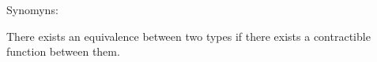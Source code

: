 \begin{code}%
\>[0]\<%
\\
\>[0][@{}l@{\AgdaIndent{0}}]%
\>[2]\AgdaSymbol{:}\AgdaSpace{}%
\AgdaSymbol{\{}\AgdaSpace{}%
\AgdaSymbol{:}\AgdaSpace{}%
\AgdaSpace{}%
\AgdaSymbol{\}}\AgdaSpace{}%
\AgdaSymbol{\{}\AgdaSpace{}%
\AgdaSymbol{:}\AgdaSpace{}%
\AgdaSpace{}%
\AgdaSymbol{\}}\<%
\\
%
\>[2]\AgdaSpace{}%
\AgdaSymbol{(}\AgdaSpace{}%
\AgdaSymbol{:}\AgdaSpace{}%
\AgdaSpace{}%
\AgdaSpace{}%
\AgdaSymbol{)}\<%
\\
%
\>[2]\AgdaSpace{}%
\AgdaSpace{}%
\AgdaSymbol{(}\AgdaSpace{}%
\AgdaSpace{}%
\AgdaSymbol{)}\<%
\\
%
\\[\AgdaEmptyExtraSkip]%
\>[0]\AgdaSpace{}%
\AgdaSymbol{\{}\AgdaSpace{}%
\AgdaSymbol{=}\AgdaSpace{}%
\AgdaSymbol{\}}\AgdaSpace{}%
\AgdaSpace{}%
\AgdaSymbol{=}\AgdaSpace{}%
\AgdaSymbol{(}\AgdaSpace{}%
\AgdaSymbol{:}\AgdaSpace{}%
\AgdaSymbol{)}\AgdaSpace{}%
\AgdaSpace{}%
\AgdaSpace{}%
\AgdaSymbol{(}\AgdaSpace{}%
\AgdaSpace{}%
\AgdaSymbol{)}\<%
\end{code}

Synomyns:
\begin{code}%
\>[0]\AgdaSpace{}%
\AgdaSymbol{=}\AgdaSpace{}%
\<%
\end{code}

There exists an equivalence between two types if there exists a
contractible function between them.


\begin{code}%
\>[0]\<%
\\
\>[0][@{}l@{\AgdaIndent{0}}]%
\>[2]\AgdaSymbol{:}\AgdaSpace{}%
\AgdaSymbol{\{}\AgdaSpace{}%
\AgdaSymbol{:}\AgdaSpace{}%
\AgdaSpace{}%
\AgdaSymbol{\}}\AgdaSpace{}%
\AgdaSymbol{\{}\AgdaSpace{}%
\AgdaSymbol{:}\AgdaSpace{}%
\AgdaSpace{}%
\AgdaSymbol{\}}\<%
\\
%
\>[2]%
\>[5]\AgdaSymbol{(}\AgdaSpace{}%
\AgdaSymbol{:}\AgdaSpace{}%
\AgdaSpace{}%
\AgdaSpace{}%
\AgdaSymbol{)}\<%
\\
%
\>[2]\AgdaSpace{}%
\AgdaSpace{}%
\AgdaSymbol{(}\AgdaSpace{}%
\AgdaSpace{}%
\AgdaSymbol{)}\<%
\\
%
\\[\AgdaEmptyExtraSkip]%
\>[0]\AgdaSpace{}%
\AgdaSpace{}%
\AgdaSymbol{=}\AgdaSpace{}%
\AgdaSpace{}%
\<%
\end{code}

